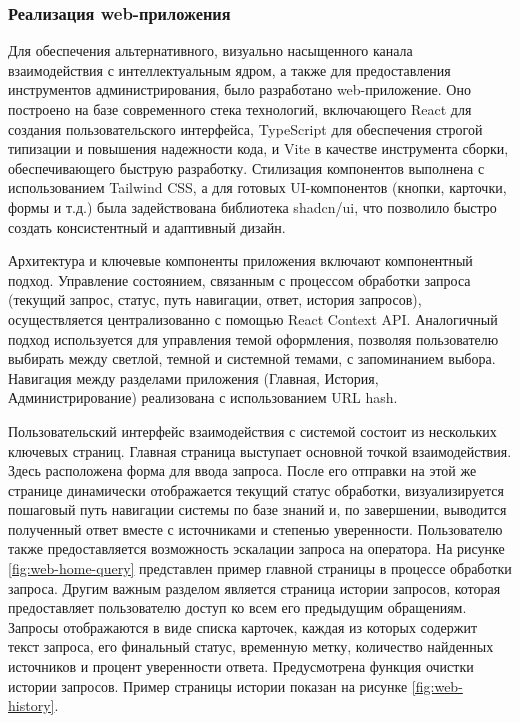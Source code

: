 \subsubsection{Реализация web-приложения}

Для обеспечения альтернативного, визуально насыщенного канала взаимодействия с интеллектуальным ядром, а также для предоставления инструментов администрирования, было разработано web-приложение. Оно построено на базе современного стека технологий, включающего React для создания пользовательского интерфейса, TypeScript для обеспечения строгой типизации и повышения надежности кода, и Vite в качестве инструмента сборки, обеспечивающего быструю разработку. Стилизация компонентов выполнена с использованием Tailwind CSS, а для готовых UI-компонентов (кнопки, карточки, формы и т.д.) была задействована библиотека shadcn/ui, что позволило быстро создать консистентный и адаптивный дизайн.

Архитектура и ключевые компоненты приложения включают компонентный подход. Управление состоянием, связанным с процессом обработки запроса (текущий запрос, статус, путь навигации, ответ, история запросов), осуществляется централизованно с помощью React Context API. Аналогичный подход используется для управления темой оформления, позволяя пользователю выбирать между светлой, темной и системной темами, с запоминанием выбора. Навигация между разделами приложения (Главная, История, Администрирование) реализована с использованием URL hash.


Пользовательский интерфейс взаимодействия с системой состоит из нескольких ключевых страниц. Главная страница выступает основной точкой взаимодействия. Здесь расположена форма для ввода запроса. После его отправки на этой же странице динамически отображается текущий статус обработки, визуализируется пошаговый путь навигации системы по базе знаний и, по завершении, выводится полученный ответ вместе с источниками и степенью уверенности. Пользователю также предоставляется возможность эскалации запроса на оператора. На рисунке \ref{fig:web-home-query} представлен пример главной страницы в процессе обработки запроса. Другим важным разделом является страница истории запросов, которая предоставляет пользователю доступ ко всем его предыдущим обращениям. Запросы отображаются в виде списка карточек, каждая из которых содержит текст запроса, его финальный статус, временную метку, количество найденных источников и процент уверенности ответа. Предусмотрена функция очистки истории запросов. Пример страницы истории показан на рисунке \ref{fig:web-history}.

